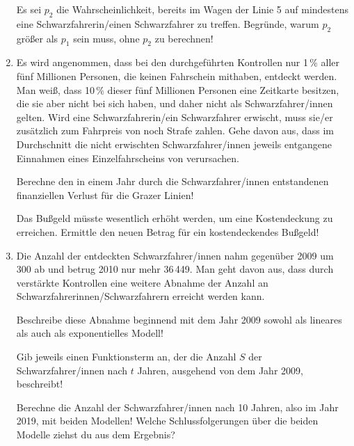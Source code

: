 \begin{langesbeispiel}
\begin{enumerate}
Es sei $p_2$ die Wahrscheinlichkeit, bereits im Wagen der Linie 5 auf mindestens eine Schwarzfahrerin/einen Schwarzfahrer zu treffen. Begründe, warum $p_2$ größer als $p_1$ sein muss, ohne $p_2$ zu berechnen!

\item  Es wird angenommen, dass bei den durchgeführten Kontrollen nur 1\,\% aller fünf Millionen Personen, die keinen Fahrschein mithaben, entdeckt werden. Man weiß, dass 10\,\% dieser fünf Millionen Personen eine Zeitkarte besitzen, die sie aber nicht bei sich haben, und daher nicht als Schwarzfahrer/innen gelten. Wird eine Schwarzfahrerin/ein Schwarzfahrer erwischt, muss sie/er zusätzlich zum Fahrpreis von  noch  Strafe zahlen. Gehe 
davon aus, dass im Durchschnitt die nicht erwischten Schwarzfahrer/innen jeweils entgangene Einnahmen eines Einzelfahrscheins von  verursachen.
  
Berechne den in einem Jahr durch die Schwarzfahrer/innen entstandenen finanziellen Verlust für die Grazer Linien! 

Das Bußgeld müsste wesentlich erhöht werden, um eine Kostendeckung zu erreichen. Ermittle den neuen Betrag für ein kostendeckendes Bußgeld!

\item Die Anzahl der entdeckten Schwarzfahrer/innen nahm gegenüber 2009 um 300 ab und betrug 2010 nur mehr 36\,449. Man geht davon aus, dass durch verstärkte Kontrollen eine weitere Abnahme der Anzahl an Schwarzfahrerinnen/Schwarzfahrern erreicht werden kann. 

Beschreibe diese Abnahme beginnend mit dem Jahr 2009 sowohl als lineares als auch als exponentielles Modell!  

Gib jeweils einen Funktionsterm an, der die Anzahl $S$ der Schwarzfahrer/innen nach $t$ Jahren, ausgehend von dem Jahr 2009, beschreibt! 

Berechne die Anzahl der Schwarzfahrer/innen nach 10 Jahren, also im Jahr 2019, mit beiden Modellen! Welche Schlussfolgerungen über die beiden Modelle ziehst du aus dem Ergebnis?
	
				\end{enumerate}\leer
				
				
\end{langesbeispiel}
